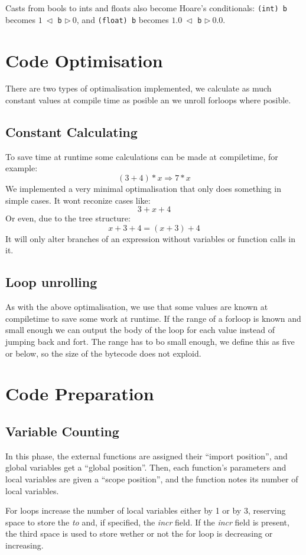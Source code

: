 \documentclass[a4paper,11pt]{report}
\begin{document}
Casts from bools to ints and floats also become Hoare's conditionals: \texttt{(int) b} becomes $1~\triangleleft$ \texttt{b} $\triangleright~0$, and \texttt{(float) b} becomes $1.0~\triangleleft$ \texttt{b} $\triangleright~0.0$.

\section{Code Optimisation}
There are two types of optimalisation implemented, we calculate as much constant values at compile time as posible an we unroll forloops where posible.
\subsection{Constant Calculating}
To save time at runtime some calculations can be made at compiletime, for example:
\[
(3+4)*x \Rightarrow 7*x
\]
We implemented a very minimal optimalisation that only does something in simple cases.
It wont reconize cases like:
\[
3+x+4
\]
Or even, due to the tree structure:
\[
x+3+4 = (x+3)+4
\]
It will only alter branches of an expression without variables or function calls in it.
\subsection{Loop unrolling}
As with the above optimalisation, we use that some values are known at compiletime to save some work at runtime.
If the range of a forloop is known and small enough we can output the body of the loop for each value instead of jumping back and fort.
The range has to bo small enough, we define this as five or below, so the size of the bytecode does not exploid.


\section{Code Preparation}
\subsection{Variable Counting}
In this phase, the external functions are assigned their ``import position'', and global variables get a ``global position''. Then, each function's parameters and local variables are given a ``scope position'', and the function notes its number of local variables. 

For loops increase the number of local variables either by 1 or by 3, reserving space to store the \emph{to} and, if specified, the \emph{incr} field. If the \emph{incr} field is present, the third space is used to store wether or not the for loop is decreasing or increasing.
\end{document}
